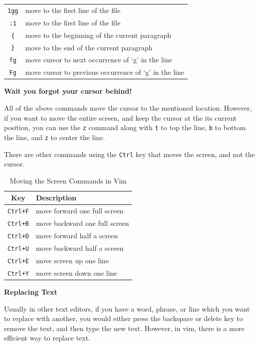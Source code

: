 \begin{table}[h!]
\begin{tabular}{c l}
    \lstinline|1gg| & move to the first line of the file \\
    \lstinline|:1| & move to the first line of the file \\
    \lstinline|{| & move to the beginning of the current paragraph \\
    \lstinline|}| & move to the end of the current paragraph \\
    \lstinline|fg| & move cursor to next occurrence of `g' in the line \\
    \lstinline|Fg| & move cursor to previous occurrence of `g' in the line \\
    \bottomrule
  \end{tabular}
\end{table}

\textbf{Wait you forgot your cursor behind!}

All of the above commands move the cursor to the
mentioned location. However, if you want to move
the entire screen, and keep the cursor at the
its current position, you can use the \lstinline|z|
command along with \lstinline|t| to top the line,
\lstinline|b| to bottom the line, and \lstinline|z| to
center the line.

There are other commands using the \lstinline|Ctrl| key
that moves the screen, and not the cursor.

\begin{table}[h!]
  \caption{Moving the Screen Commands in Vim}
  \begin{tabular}{c l}
    \toprule
    Key & Description \\
    \midrule
    \lstinline|Ctrl+F| & move forward one full screen \\
    \lstinline|Ctrl+B| & move backward one full screen \\
    \lstinline|Ctrl+D| & move forward half a screen \\
    \lstinline|Ctrl+U| & move backward half a screen \\
    \lstinline|Ctrl+E| & move screen up one line \\
    \lstinline|Ctrl+Y| & move screen down one line \\
    \bottomrule
  \end{tabular}
\end{table}

\textbf{Replacing Text}

Usually in other text editors, if you have a word, phrase, or line
which you want to replace with another, you would either press
the backspace or delete key to remove the text, and then type
the new text. However, in vim, there is a more efficient way
to replace text.

